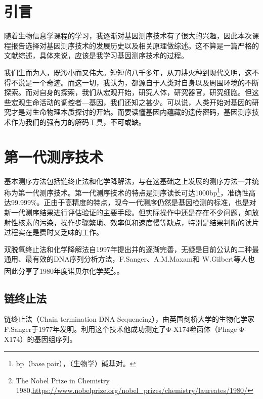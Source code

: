 \documentclass[12pt]{article} %
\begin{document}
\tableofcontents %

\newpage %


\section{引言} 
随着生物信息学课程的学习，我逐渐对基因测序技术有了很大的兴趣，因此本次课程报告选择对基因测序技术的发展历史以及相关原理做综述。这不算是一篇严格的文献综述，具体来说，应该是我学习基因测序技术的过程。


我们生而为人，既渺小而又伟大。短短的八千多年，从刀耕火种到现代文明，这不得不说是一个奇迹。而这一切，我认为，都源自于人类对自身以及周围环境的不断探索。而对自身的探索，我们从宏观开始，研究人体，研究器官，研究细胞。但这些宏观生命活动的调控者—基因，我们还知之甚少。可以说，人类开始对基因的研究才是对生命物理本质探讨的开始。而要读懂基因内蕴藏的遗传密码，基因测序技术作为我们的强有力的解码工具，不可或缺。



\section{第一代测序技术} %

基本测序方法包括链终止法和化学降解法，与在这基础之上发展的测序方法一并统称为第一代测序技术。第一代测序技术的特点是测序读长可达1000bp\footnote{ bp（base pair），（生物学）碱基对。}，准确性高达99.999\%。正由于高精度的特点，现今一代测序仍然是基因检测的标准，也是对新一代测序结果进行评估验证的主要手段。但实际操作中还是存在不少问题，如放射性核素的污染，操作步骤繁琐、效率低和速度慢等缺点，特别是结果判断的读片过程实在是费时又乏味的工作。


双脱氧终止法和化学降解法自1997年提出并的逐渐完善，无疑是目前公认的二种最通用、最有效的DNA序列分析方法，F.Sanger、A.M.Maxam和 W.Gilbert等人也因此分享了1980年度诺贝尔化学奖\footnote{The Nobel Prize in Chemistry 1980,\url{https://www.nobelprize.org/nobel_prizes/chemistry/laureates/1980/} }。。


\subsection{链终止法} %
链终止法（Chain termination DNA Sequencing），由英国剑桥大学的生物化学家F.Sanger于1977年发明。利用这个技术他成功测定了Φ-X174噬菌体（Phage Φ-X174）的基因组序列\cite{Paper:sanger}。
\end{document}
